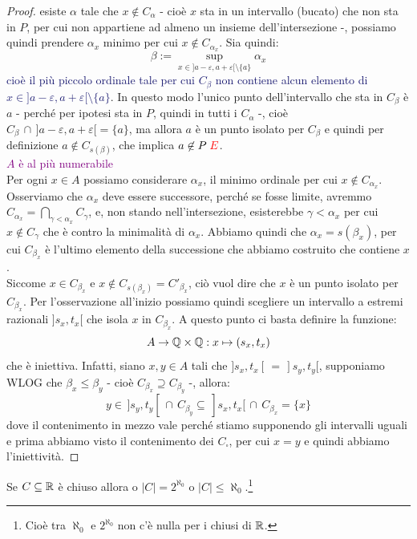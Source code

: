 \begin{proof}
	esiste $\alpha$ tale che $x \not \in C_\alpha$ - cio\`e $x$ sta in un intervallo (bucato) che non sta in $P$, per cui non appartiene ad almeno un insieme dell'intersezione -, possiamo quindi prendere $\alpha_x$ minimo per cui $x \not \in C_{\alpha_x}$.
	Sia quindi:
	\[ \beta := \sup_{x \in ]a - \varepsilon, a + \varepsilon[ \setminus\{a\}} \alpha_x
		\]
	\textcolor{MidnightBlue}{cio\`e il pi\`u piccolo ordinale tale per cui $C_\beta$ non contiene alcun elemento di $x \in ]a - \varepsilon, a + \varepsilon[ \setminus\{a\}$}.
	In questo modo l'unico punto dell'intervallo che sta in $C_\beta$ \`e $a$ - perch\'e per ipotesi sta in $P$, quindi in tutti i $C_\alpha$ -, cio\`e $C_\beta \,\cap\, ]a - \varepsilon, a + \varepsilon[ = \{a\}$, ma allora $a$ \`e un punto isolato per $C_\beta$ e quindi per definizione $a \not \in C_{s(\beta)}$, che implica $a \not \in P \;\textcolor{red}{\lightning}$.\\
	\textcolor{purple}{$A$ \`e al pi\`u numerabile}\\
	Per ogni $x \in A$ possiamo considerare $\alpha_x$, il minimo ordinale per cui $x \not \in C_{\alpha_x}$. Osserviamo che $\alpha_x$ deve essere successore,
	perch\'e se fosse limite, avremmo $C_{\alpha_x} = \bigcap_{\gamma < \alpha_x} C_\gamma$, e, non stando nell'intersezione, esisterebbe $\gamma < \alpha_x$ per cui $x \not \in C_\gamma$ che \`e contro la minimalit\`a di $\alpha_x$.
	Abbiamo quindi che $\alpha_x = s(\beta_x)$, per cui $C_{\beta_x}$ \`e l'ultimo elemento della successione che abbiamo costruito che contiene $x$.\\
	Siccome $x \in C_{\beta_x}$ e $x \not\in C_{s(\beta_x)} = C'_{\beta_x}$, ci\`o vuol dire che $x$ \`e un punto isolato per $C_{\beta_x}$. Per l'osservazione all'inizio possiamo quindi scegliere un intervallo a estremi razionali $]s_x,t_x[$ che isola $x$ in $C_{\beta_x}$.
	A questo punto ci basta definire la funzione:
	\[ A \to \mathbb Q \times \mathbb Q : x \mapsto (s_x,t_x)
		\]
	che \`e iniettiva. Infatti, siano $x,y \in A$ tali che $]s_x,t_x[ \,=\, ]s_y,t_y[$, supponiamo WLOG che $\beta_x \leq \beta_y$ - cio\`e $C_{\beta_x} \supseteq C_{\beta_y}$ -, allora:
	\[ y \in\, ]s_y,t_y[ \, \cap \, C_{\beta_y} \subseteq \, ]s_x,t_x[ \, \cap \, C_{\beta_x} = \{x\}
		\]
	dove il contenimento in mezzo vale perch\'e stiamo supponendo gli intervalli uguali e prima abbiamo visto il contenimento dei $C_{\square}$, per cui $x = y$ e quindi abbiamo l'iniettivit\`a.
\end{proof}

\begin{corollary}
	Se $C \subseteq \mathbb R$ \`e chiuso allora o $|C|=2^{\aleph_0}$ o $|C| \leq \aleph_0$.\footnote{Cio\`e tra $\aleph_0$ e $2^{\aleph_0}$ non c'\`e nulla per i chiusi di $\mathbb R$.}
\end{corollary}

